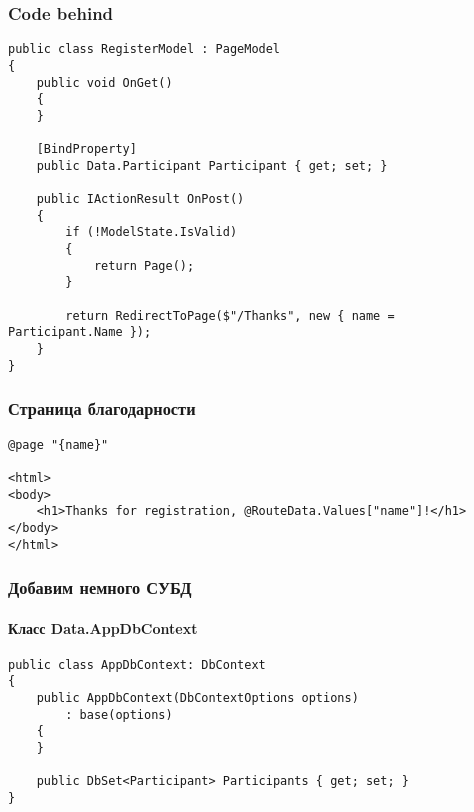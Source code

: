 \documentclass[xetex,mathserif,serif]{beamer}
\begin{document}
	\begin{frame}[fragile]
		\frametitle{Code behind}
		\begin{footnotesize}
			\begin{verbatim}
public class RegisterModel : PageModel
{
    public void OnGet()
    {
    }

    [BindProperty]
    public Data.Participant Participant { get; set; }

    public IActionResult OnPost()
    {
        if (!ModelState.IsValid)
        {
            return Page();
        }

        return RedirectToPage($"/Thanks", new { name = Participant.Name });
    }
}
			\end{verbatim}
		\end{footnotesize}
	\end{frame}

	\begin{frame}[fragile]
		\frametitle{Страница благодарности}
		\begin{small}
			\begin{verbatim}
@page "{name}"

<html>
<body>
    <h1>Thanks for registration, @RouteData.Values["name"]!</h1>
</body>
</html>
			\end{verbatim}
		\end{small}
	\end{frame}

	\begin{frame}[fragile]
		\frametitle{Добавим немного СУБД}
		\framesubtitle{Класс Data.AppDbContext}
		\begin{small}
			\begin{verbatim}
public class AppDbContext: DbContext
{
    public AppDbContext(DbContextOptions options)
        : base(options)
    {
    }

    public DbSet<Participant> Participants { get; set; }
}
			\end{verbatim}
		\end{small}
	\end{frame}
\end{document}
